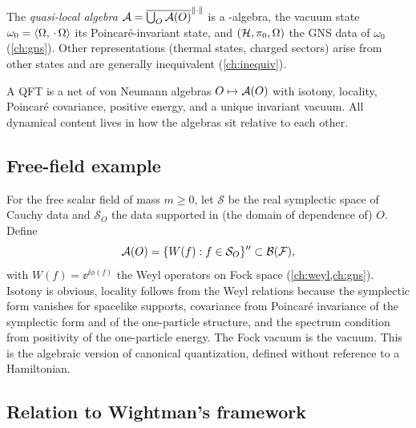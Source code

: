 The \emph{quasi-local algebra} $\mathcal{A}=\overline{\bigcup_O\mathcal{A}(O)}^{\lVert \cdot\rVert}$ is a \cstar-algebra, the vacuum state $\omega_0=\langle \Omega,\,\cdot\,\Omega\rangle$ its Poincar\'e-invariant state, and $(\mathcal{H},\pi_0,\Omega)$ the GNS data of $\omega_0$ (\cref{ch:gns}). Other representations (thermal states, charged sectors) arise from other states and are generally inequivalent (\cref{ch:inequiv}).

\begin{keyidea}
A QFT is a net of von Neumann algebras $O\mapsto\mathcal{A}(O)$ with isotony, locality, Poincar\'e covariance, positive energy, and a unique invariant vacuum. All dynamical content lives in how the algebras sit relative to each other.
\end{keyidea}

\subsection{Free-field example}

For the free scalar field of mass $m\ge0$, let $\mathcal S$ be the real symplectic space of Cauchy data and $\mathcal S_O$ the data supported in (the domain of dependence of) $O$. Define
\begin{equation}
\mathcal{A}(O)=\{W(f):f\in\mathcal S_O\}''\subset\mathcal{B}(\mathcal F),
\end{equation}
with $W(f)=\ee^{\ii\phi(f)}$ the Weyl operators on Fock space (\cref{ch:weyl,ch:gns}). Isotony is obvious, locality follows from the Weyl relations because the symplectic form vanishes for spacelike supports, covariance from Poincar\'e invariance of the symplectic form and of the one-particle structure, and the spectrum condition from positivity of the one-particle energy. The Fock vacuum is the vacuum. This is the algebraic version of canonical quantization, defined without reference to a Hamiltonian.

\subsection{Relation to Wightman's framework}

